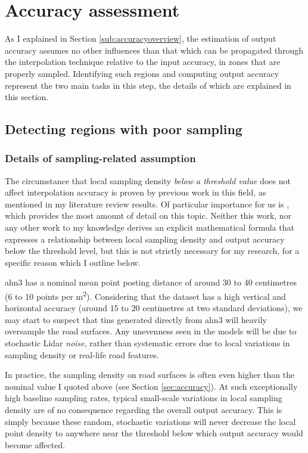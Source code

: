 \section{Accuracy assessment}
\label{sec:m_accuracyassessment}

As I explained in Section \ref{sub:accuracyoverview}, the estimation of output accuracy assumes no other influences than that which can be propagated through the interpolation technique relative to the input accuracy, in zones that are properly sampled. Identifying such regions and computing output accuracy represent the two main tasks in this step, the details of which are explained in this section.

\subsection{Detecting regions with poor sampling}
\label{sub:m_accuracypoorsampling}

\subsubsection{Details of sampling-related assumption}

The circumstance that local sampling density \textit{below a threshold value} does not affect interpolation accuracy is proven by previous work in this field, as mentioned in my literature review results. Of particular importance for us is \cite{guo_etal_2010}, which provides the most amount of detail on this topic. Neither this work, nor any other work to my knowledge derives an explicit mathematical formula that expresses a relationship between local sampling density and output accuracy below the threshold level, but this is not strictly necessary for my research, for a specific reason which I outline below.

\ac{ahn3} has a nominal mean point posting distance of around 30 to 40 centimetres (6 to 10 points per m\textsuperscript{2}). Considering that the dataset has a high vertical and horizontal accuracy (around 15 to 20 centimetres at two standard deviations), we may start to suspect that \ac{tin}s generated directly from \ac{ahn3} will heavily oversample the road surfaces. Any unevenness seen in the models will be due to stochastic Lidar \textit{noise}, rather than systematic errors due to local variations in sampling density or real-life road features.

In practice, the sampling density on road surfaces is often even higher than the nominal value I quoted above (see Section \ref{sec:accuracy}). At such exceptionally high baseline sampling rates, typical small-scale variations in local sampling density are of no consequence regarding the overall output accuracy. This is simply because these random, stochastic variations will never decrease the local point density to anywhere near the threshold below which output accuracy would become affected.

